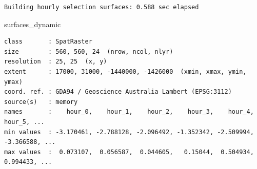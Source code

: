 \documentclass[
  letterpaper,
  DIV=11,
  numbers=noendperiod]{scrartcl}
\newenvironment{Shaded}{\begin{snugshade}}{\end{snugshade}}
\newcommand{\CommentTok}[1]{\textcolor[rgb]{0.37,0.37,0.37}{#1}}
\newcommand{\ControlFlowTok}[1]{\textcolor[rgb]{0.00,0.23,0.31}{\textbf{#1}}}
\newcommand{\DecValTok}[1]{\textcolor[rgb]{0.68,0.00,0.00}{#1}}
\newcommand{\FunctionTok}[1]{\textcolor[rgb]{0.28,0.35,0.67}{#1}}
\newcommand{\NormalTok}[1]{\textcolor[rgb]{0.00,0.23,0.31}{#1}}
\newcommand{\OtherTok}[1]{\textcolor[rgb]{0.00,0.23,0.31}{#1}}
\newcommand{\SpecialCharTok}[1]{\textcolor[rgb]{0.37,0.37,0.37}{#1}}
\newcommand{\StringTok}[1]{\textcolor[rgb]{0.13,0.47,0.30}{#1}}
\begin{document}
\begin{Shaded}
\end{Shaded}

\begin{verbatim}
Building hourly selection surfaces: 0.588 sec elapsed
\end{verbatim}

\begin{Shaded}
\begin{Highlighting}[]
\NormalTok{surfaces\_dynamic}
\end{Highlighting}
\end{Shaded}

\begin{verbatim}
class       : SpatRaster
size        : 560, 560, 24  (nrow, ncol, nlyr)
resolution  : 25, 25  (x, y)
extent      : 17000, 31000, -1440000, -1426000  (xmin, xmax, ymin, ymax)
coord. ref. : GDA94 / Geoscience Australia Lambert (EPSG:3112)
source(s)   : memory
names       :    hour_0,    hour_1,    hour_2,    hour_3,    hour_4,    hour_5, ...
min values  : -3.170461, -2.788128, -2.096492, -1.352342, -2.509994, -3.366588, ...
max values  :  0.073107,  0.056587,  0.044605,   0.15044,  0.504934,  0.994433, ...
\end{verbatim}
\end{document}

